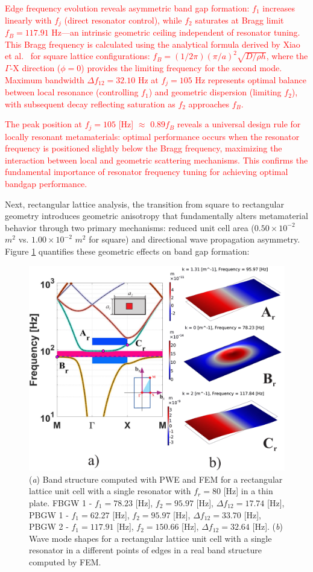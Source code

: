 \documentclass[review,numbers,sort&compress]{elsarticle}
\begin{document}
\textcolor{red}{Edge frequency evolution reveals asymmetric band gap formation: $f_1$ increases linearly with $f_j$ (direct resonator control), while $f_2$ saturates at Bragg limit $f_B = 117.91$ Hz---an intrinsic geometric ceiling independent of resonator tuning. This Bragg frequency is calculated using the analytical formula derived by Xiao et al.~\cite{Xiao_2012} for square lattice configurations: $f_B = (1/2\pi)(\pi/a)^2\sqrt{D/\rho h}$, where the $\Gamma$-X direction ($\phi = 0$) provides the limiting frequency for the second mode. Maximum bandwidth $\Delta f_{12} = 32.10$ Hz at $f_j = 105$ Hz represents optimal balance between local resonance (controlling $f_1$) and geometric dispersion (limiting $f_2$), with subsequent decay reflecting saturation as $f_2$ approaches $f_B$.}

\textcolor{red}{The peak position at $f_j = 105$ [Hz] $\approx$ $0.89 f_B$ reveals a universal design rule for locally resonant metamaterials: optimal performance occurs when the resonator frequency is positioned slightly below the Bragg frequency, maximizing the interaction between local and geometric scattering mechanisms. This confirms the fundamental importance of resonator frequency tuning for achieving optimal bandgap performance.} 


Next, rectangular lattice analysis, the transition from square to rectangular geometry introduces geometric anisotropy that fundamentally alters metamaterial behavior through two primary mechanisms: reduced unit cell area ($0.50 \times 10^{-2}$ $m^2$ vs. $1.00 \times 10^{-2}$ $m^2$ for square) and directional wave propagation asymmetry. Figure \ref{pwe_fem_disp_modal_rect} quantifies these geometric effects on band gap formation:
\newpage
\begin{figure}[htb]
	\centering
	\includegraphics[width=.8\textwidth]{1_2_disp_frf_rect.pdf}
	\caption{(\textit{a}) Band structure computed with PWE and FEM for a rectangular lattice unit cell with a single resonator with $f_r = 80$ [Hz] in a thin plate. FBGW 1 - $f_1 = 78.23$ [Hz], $f_2 = 95.97$ [Hz], $\Delta f_{12} = 17.74 $ [Hz], PBGW 1 - $f_1 = 62.27$ [Hz], $f_2 = 95.97$ [Hz], $\Delta f_{12} = 33.70 $ [Hz], PBGW 2 - $f_1 = 117.91$ [Hz], $f_2 = 150.66$ [Hz], $\Delta f_{12} = 32.64 $ [Hz]. (\textit{b}) Wave mode shapes for a rectangular lattice unit cell with a single resonator in a different points of edges in a real band structure computed by FEM.}
	\label{pwe_fem_disp_modal_rect}
\end{figure}
\end{document}
